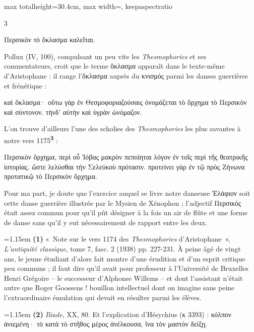 \documentclass[11pt,twoside]{book}
\newcommand{\italique}[1]{\textit{#1}}
\newcommand{\citComm}[1]{\begin{quoting}[vskip=0.4pt,leftmargin=0.7em,rightmargin=0.2em]#1\end{quoting}}
\newcommand{\marqueur}[1]{\textsuperscript{\color{rubricRed}\textbf{#1}}}
\begin{document}
\begin{adjustbox}{max totalheight=30.4cm, max width=\textwidth, keepaspectratio}
\begin{minipage}{\textwidth}
{\begin{multicols}{3}
\citComm{Περσικὸν τὸ ὄκλασμα καλεῖται.}
\par\vspace{1.5pt}
\noindent Pollux (IV, 100), compulsant un peu vite les \italique{Thesmophories} et ses commentateurs, croit que le terme ὄκλασμα apparaît dans le texte-même d'Aristophane : il range l'ὄκλασμα auprès du κνισμός parmi les danses guerrières et frénétique :
\citComm{καὶ ὄκλασμα· οὕτω γὰρ ἐν Θεσμοφοριαζούσαις ὀνομάζεται τὸ ὄρχημα τὸ Περσικὸν καὶ σύντονον. τὴνδ' αὐτὴν καὶ ὑγρὰν ὠνόμαζον.}
\par\vspace{1.5pt}
\noindent L'on trouve d'ailleurs l'une des scholies des \italique{Thesmophories} les plus savantes à notre vers 1175\marqueur{3} :
\citComm{Περσικὸν ὄρχημα, περὶ οὗ Ἰόβας μακρὸν πεποίηται λόγον ἐν τοῖς περὶ τῆς θεατρικῆς ἱστορίας. ὥστε λελύσθαι τὴν Σελεύκοὺ πρότασιν. προτείνει γὰρ ἐν τῷ πρὸς Ζήνωνα προτατικῷ τὸ Περσικὸν ὄρχημα.}
\par\vspace{1.5pt}
\noindent Pour ma part, je doute que l'exercice auquel se livre notre danseuse Ἐλάφιον soit cette danse guerrière illustrée par le Mysien de Xénophon ; l'adjectif Περσικός était assez commun pour qu'il pût désigner à la fois un air de flûte et une forme de danse sans qu'il y eut nécessairement de rapport entre les deux.
\par\vspace{1.5pt}
\par\vspace{1.2pt}\par\nopagebreak\vspace{1pt}\noindent\hangindent=1.15em {\color{sepiaNote}\textbf{(1)}} «~Note sur le vers 1174 des \italique{Thesmophories} d'Aristophane~», \italique{L'antiquité classique}, tome 7, fasc. 2 (1938) pp. 227-231. À peine âgé de vingt ans, le jeune étudiant d'alors fait montre d'une érudition et d'un esprit critique peu communs ; il faut dire qu'il avait pour professeur à l'Université de Bruxelles Henri Grégoire -- le successeur d'Alphonse Willems -- et dont l'assistant n'était autre que Roger Goossens ! bouillon intellectuel dont on imagine sans peine l'extraordinaire émulation qui devait en résulter parmi les élèves.
\par\vspace{1.5pt}
\noindent\hangindent=1.15em {\color{sepiaNote}\textbf{(2)}} \italique{Iliade}, XX, 80. Et l'explication d'Hésychius (κ 3393) : κόλπον ἀνιεμένη· τὸ κατὰ τὸ στῆθος μέρος ἀνέλκουσα, ἵνα τὸν μαστὸν δείξῃ.

\end{multicols}}
\end{minipage}
\end{adjustbox}
\end{document}
